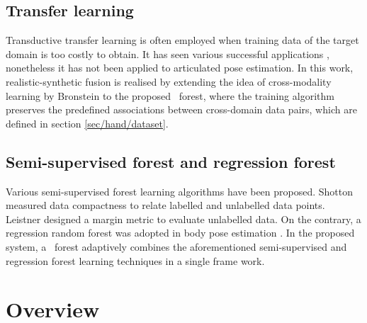 \subsection{Transfer learning} 
Transductive transfer learning is often employed when training data of the target domain is too costly to obtain. 
It has seen various successful applications \cite{Pan2010}, nonetheless it has not been applied to articulated pose estimation. 
In this work, realistic-synthetic fusion is realised by extending the idea of cross-modality learning by Bronstein \etal \cite{Bronstein2010} to the proposed \STR\ forest, where the training algorithm preserves the predefined associations between cross-domain data pairs, which are defined in section \ref{sec/hand/dataset}.  

\subsection{Semi-supervised forest and regression forest} 
Various semi-supervised forest learning algorithms have been proposed. Shotton \etal \cite{Shotton2013} measured data compactness to relate labelled and unlabelled data points. Leistner \etal \cite{Leistner2009} designed a margin metric to evaluate unlabelled data. On the contrary, a regression random forest was adopted in body pose estimation \cite{Girshick2011, Sun2012}. In the proposed system, a \STR\ forest adaptively combines the aforementioned semi-supervised and regression forest learning techniques in a single frame work.

\section{Overview}


